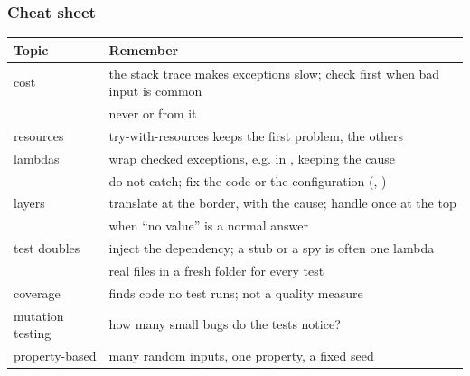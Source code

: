 \documentclass[aspectratio=169,10pt,compress]{beamer}
\begin{document}
\begin{frame}[t,fragile] \frametitle{Cheat sheet}


\begin{table}
		\scriptsize
		\begin{tabular}{@{}L{0.30\textwidth}L{0.62\textwidth}@{}}
			\toprule
			\textbf{Topic} & \textbf{Remember} \\
			\midrule
			cost             & the stack trace makes exceptions slow; check first when bad input is common \\
			   & never  or  from it \\
			resources        & try-with-resources keeps the first problem,  the others \\
			lambdas          & wrap checked exceptions, e.g. in , keeping the cause \\
			     & do not catch; fix the code or the configuration (, ) \\
			layers           & translate at the border, with the cause; handle once at the top \\
			  & when ``no value'' is a normal answer \\
			test doubles     & inject the dependency; a stub or a spy is often one lambda \\
			  & real files in a fresh folder for every test \\
			coverage         & finds code no test runs; not a quality measure \\
			mutation testing & how many small bugs do the tests notice? \\
			property-based   & many random inputs, one property, a fixed seed \\
			\bottomrule
		\end{tabular}
\end{table}%
\end{frame}
\end{document}

